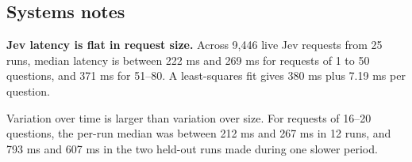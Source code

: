 \documentclass[11pt]{article}
\newcommand{\src}[1]{}
\begin{document}
\subsection{Systems notes}
\textbf{Jev latency is flat in request size.} Across 9,446\src{bench/results/jev_latency.json} live Jev requests from 25\src{bench/results/jev_latency.json} runs, median latency is between 222 ms\src{bench/results/jev_latency.json} and 269 ms\src{bench/results/jev_latency.json} for requests of 1 to 50 questions, and 371 ms\src{bench/results/jev_latency.json} for 51--80. A least-squares fit gives 380 ms\src{bench/results/jev_latency.json} plus 7.19\src{bench/results/jev_latency.json} ms per question.

Variation over time is larger than variation over size. For requests of 16--20 questions, the per-run median was between 212 ms\src{bench/results/jev_latency.json: per-run median, 16–20-question requests, runs with ≥30 such requests} and 267 ms\src{bench/results/jev_latency.json: per-run median, 16–20-question requests, runs with ≥30 such requests} in 12\src{bench/results/jev_latency.json: runs with ≥30 16–20-question requests, excluding conv-30 and conv-41} runs, and 793 ms\src{bench/results/jev_latency.json: per-run median, 16–20-question requests} and 607 ms\src{bench/results/jev_latency.json: per-run median, 16–20-question requests} in the two held-out runs made during one slower period.
\end{document}

